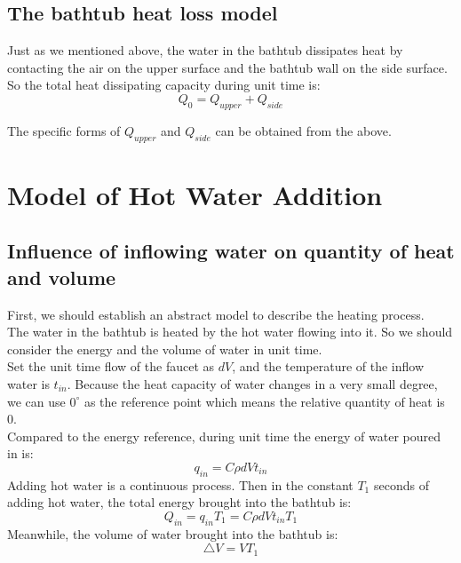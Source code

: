 \documentclass{mcmthesis}
\begin{document}
\subsection{The bathtub heat loss model} 	%

\indent Just as we mentioned above, the water in the bathtub dissipates heat by contacting the air on the upper surface and the bathtub wall on the side surface. \\

\indent So the total heat dissipating capacity during unit time is:
\begin{equation}
	Q_{0}=Q_{upper}+Q_{side}
\end{equation}


\indent The specific forms of $Q_{upper}$ and $Q_{side}$ can be obtained from the above. 

\section{Model of Hot Water Addition}
\subsection{Influence of inflowing water on quantity of heat and volume}
\indent First, we should establish an abstract model to describe the heating process.\\
\indent The water in the bathtub is heated by the hot water flowing into it. So we should consider the energy and the volume of water in unit time. \\
\indent Set the unit time flow of the faucet as $ dV $, and the temperature of the inflow water is $ t_{in}$. Because the  heat capacity of water changes in a very small degree, we can use $0^{\circ}$ as the reference point which means the relative quantity of heat is 0.\\
\indent Compared to the energy reference, during unit time the energy of water poured in is:
\begin{equation}
	q_{in}=C\rho dVt_{in} 
\end{equation}
\indent Adding hot water is a continuous process. Then in the constant $ T_{1} $ seconds of adding hot water, the total energy brought into the bathtub is:
\begin{equation}
	Q_{in}=q_{in}T_{1}=C\rho dVt_{in}T_{1}
\end{equation}
\indent Meanwhile, the volume of water brought into the bathtub is:
\begin{equation}
	\bigtriangleup V=VT_{1} 
\end{equation}
\end{document}
